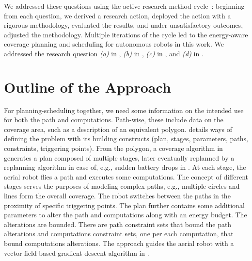 We addressed these questions using the active research method cycle~\citep{gerald1978assessment}: beginning from each question, we derived a research action, deployed the action with a rigorous methodology, evaluated the results, and under unsatisfactory outcomes, adjusted the methodology. Multiple iterations of the cycle led to the energy-aware coverage planning and scheduling for autonomous robots in this work. We addressed the research question \textit{(a)} in , \textit{(b)} in , \textit{(c)} in , and \textit{(d)} in .


\section{Outline of the Approach}
\label{sec:outline}

For planning-scheduling together, we need some information on the intended use for both the path and computations. Path-wise, these include data on the coverage area, such as a description of an equivalent polygon.  details ways of defining the problem with its building constructs (plan, stages, parameters, paths, constraints, triggering points). From the polygon, a coverage algorithm in  generates a plan composed of multiple stages, later eventually replanned by a replanning algorithm in case of, e.g., sudden battery drops in . At each stage, the aerial robot flies a path and executes some computations. The concept of different stages serves the purposes of modeling complex paths, e.g., multiple circles and lines form the overall coverage. The robot switches between the paths in the proximity of specific triggering points. The plan further contains some additional parameters to alter the path and computations along with an energy budget. The alterations are bounded. There are path constraint sets that bound the path alterations and computations constraint sets, one per each computation, that bound computations alterations. The approach guides the aerial robot with a vector field-based gradient descent algorithm in . 

